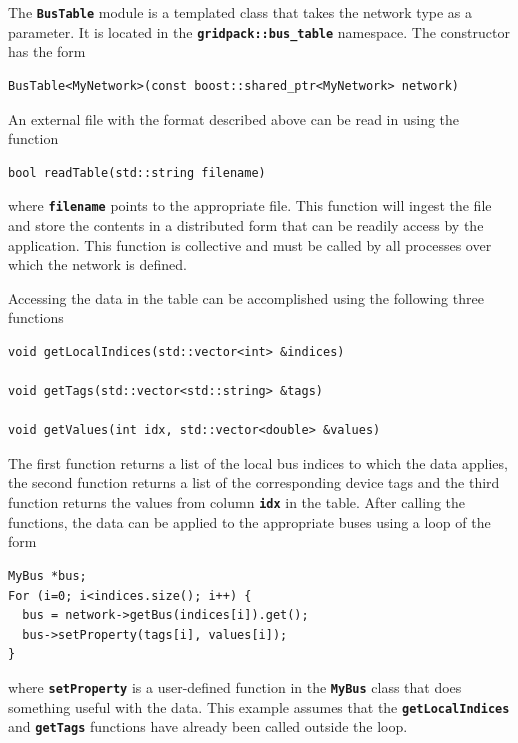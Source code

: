 \documentclass[12pt]{report} %
\begin{document}
The \texttt{\textbf{BusTable}} module is a templated class that takes the network type as a parameter.  It is located in the \texttt{\textbf{gridpack::bus\_table}} namespace. The constructor has the form

{
\color{red}
\begin{Verbatim}[fontseries=b]
BusTable<MyNetwork>(const boost::shared_ptr<MyNetwork> network)
\end{Verbatim}
}

An external file with the format described above can be read in using the function

{
\color{red}
\begin{Verbatim}[fontseries=b]
bool readTable(std::string filename)
\end{Verbatim}
}

where \texttt{\textbf{filename}} points to the appropriate file. This function will ingest the file and store the contents in a distributed form that can be readily access by the application. This function is collective and must be called by all processes over which the network is defined.

Accessing the data in the table can be accomplished using the following three functions

{
\color{red}
\begin{Verbatim}[fontseries=b]
void getLocalIndices(std::vector<int> &indices)

void getTags(std::vector<std::string> &tags)

void getValues(int idx, std::vector<double> &values)
\end{Verbatim}
}

The first function returns a list of the local bus indices to which the data applies, the second function returns a list of the corresponding device tags and the third function returns the values from column \texttt{\textbf{idx}} in the table.
After calling the functions, the data can be applied to the appropriate buses using a loop of the form

{
\color{red}
\begin{Verbatim}[fontseries=b]
MyBus *bus;
For (i=0; i<indices.size(); i++) {
  bus = network->getBus(indices[i]).get();
  bus->setProperty(tags[i], values[i]);
}
\end{Verbatim}
}

where \texttt{\textbf{setProperty}} is a user-defined function in the \texttt{\textbf{MyBus}} class that does something useful with the data. This example assumes that the \texttt{\textbf{getLocalIndices}} and \texttt{\textbf{getTags}} functions have already been called outside the loop.
\end{document}
